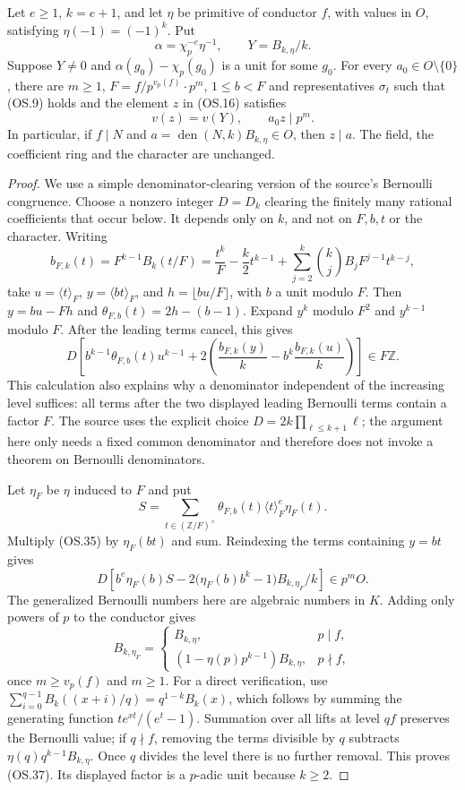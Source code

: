 \begin{proposition}
Let $e\ge1$, $k=e+1$, and let $\eta$ be primitive of conductor
$f$, with values in $O$, satisfying
$\eta(-1)=(-1)^k$.  Put
\[
       \alpha=\chi_p^{-e}\eta^{-1},\qquad
       Y=B_{k,\eta}/k.
 \tag{OS.33}
\]
Suppose $Y\ne0$ and $\alpha(g_0)-\chi_p(g_0)$ is a unit for
some $g_0$.  For every $a_0\in O\setminus\{0\}$, there are
$m\ge1$, $F=f/p^{v_p(f)}\cdot p^m$, $1\le b<F$ and
representatives $\sigma_t$ such that (OS.9) holds and the element
$z$ in (OS.16) satisfies
\[
              v(z)=v(Y),\qquad a_0z\mid p^m.
 \tag{OS.34}
\]
In particular, if $f\mid N$ and
$a=\operatorname{den}(N,k)B_{k,\eta}\in O$, then $z\mid a$.
The field, the coefficient ring and the character are unchanged.
\end{proposition}
\begin{proof}
We use a simple denominator-clearing version of the source's
Bernoulli congruence.  Choose a nonzero integer $D=D_k$ clearing
the finitely many rational coefficients that occur below.
It depends only on $k$, and not on $F,b,t$ or the character.
Writing
\[
 b_{F,k}(t)=F^{k-1}B_k(t/F)
          =\frac{t^k}{F}-\frac{k}{2}t^{k-1}
             +\sum_{j=2}^k\binom{k}{j}B_jF^{j-1}t^{k-j},
\]
take $u=\langle t\rangle_F$, $y=\langle bt\rangle_F$,
and $h=\lfloor bu/F\rfloor$, with $b$ a unit modulo $F$.
Then $y=bu-Fh$ and
$\theta_{F,b}(t)=2h-(b-1)$.
Expand $y^k$ modulo $F^2$ and $y^{k-1}$ modulo $F$.
After the leading terms cancel, this gives
\[
 D\left[b^{k-1}\theta_{F,b}(t)u^{k-1}
       +2\left(\frac{b_{F,k}(y)}k
                   -b^k\frac{b_{F,k}(u)}k\right)\right]\in F\mathbb Z.
 \tag{OS.35}
\]
This calculation also explains why a denominator independent of
the increasing level suffices: all terms after the two displayed
leading Bernoulli terms contain a factor $F$.
The source uses the explicit choice
$D=2k\prod_{\ell\le k+1}\ell$; the argument here only needs a
fixed common denominator and therefore does not invoke a theorem
on Bernoulli denominators.

Let $\eta_F$ be $\eta$ induced to $F$ and put
\[
 S=\sum_{t\in(\mathbb Z/F)^\times}
          \theta_{F,b}(t)\langle t\rangle_F^{e}\eta_F(t).
\]
Multiply (OS.35) by $\eta_F(bt)$ and sum.
Reindexing the terms containing $y=bt$ gives
\[
 D\left[b^e\eta_F(b)S
       -2\bigl(\eta_F(b)b^k-1\bigr)B_{k,\eta_F}/k\right]
                                               \in p^m O.
 \tag{OS.36}
\]
The generalized Bernoulli numbers here are algebraic numbers in
$K$.  Adding only powers of $p$ to the conductor gives
\[
 B_{k,\eta_F}=
 \begin{cases}
 B_{k,\eta},&p\mid f,\\
 (1-\eta(p)p^{k-1})B_{k,\eta},&p\nmid f,
 \end{cases}
 \tag{OS.37}
\]
once $m\ge v_p(f)$ and $m\ge1$.
For a direct verification, use
$\sum_{i=0}^{q-1}B_k((x+i)/q)=q^{1-k}B_k(x)$,
which follows by summing the generating function
$te^{xt}/(e^t-1)$.  Summation over all lifts at level $qf$
preserves the Bernoulli value; if $q\nmid f$, removing the terms
divisible by $q$ subtracts $\eta(q)q^{k-1}B_{k,\eta}$.
Once $q$ divides the level there is no further removal.
This proves (OS.37).  Its displayed factor is a $p$-adic unit
because $k\ge2$.


\end{proof}
